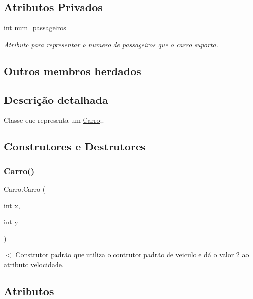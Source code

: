 \subsection*{Atributos Privados}
\begin{DoxyCompactItemize}
\item 
int \mbox{\hyperlink{class_carro_a60e3f3d344a7d3eebdf3104ff05de951}{num\+\_\+passageiros}}
\begin{DoxyCompactList}\small\item\em Atributo para representar o numero de passageiros que o carro suporta. \end{DoxyCompactList}\end{DoxyCompactItemize}
\subsection*{Outros membros herdados}


\subsection{Descrição detalhada}
Classe que representa um \mbox{\hyperlink{class_carro}{Carro}};. 

\subsection{Construtores e Destrutores}
\mbox{\label{class_carro_a52627c022471d194effbc51864c939c8}} 
\subsubsection{\texorpdfstring{Carro()}{Carro()}}
{\footnotesize\ttfamily Carro.\+Carro (\begin{DoxyParamCaption}\item[{int}]{x,  }\item[{int}]{y }\end{DoxyParamCaption})}

$<$ Construtor padrão que utiliza o contrutor padrão de veiculo e dá o valor 2 ao atributo velocidade. 

\subsection{Atributos}
\mbox{\label{class_carro_a60e3f3d344a7d3eebdf3104ff05de951}} 
